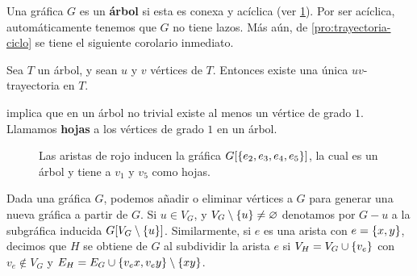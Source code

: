 Una gr\'afica $G$ es un \textbf{\'arbol} si esta es conexa
y ac\'iclica (ver \cref{fig:grafica-dibujo3}). Por ser ac\'iclica, autom\'aticamente tenemos que $G$ no tiene
lazos. M\'as a\'un, de \cref{pro:trayectoria-ciclo} se tiene el siguiente
corolario inmediato.

\begin{corolario}
\label{cor:unitray}
  Sea $T$ un \'arbol, y sean $u$ y $v$ v\'ertices de $T$. Entonces existe una
  \'unica $uv$-trayectoria en $T$.
\end{corolario}

 implica que en un \'arbol no trivial existe al menos un
v\'ertice de grado $1$. Llamamos \textbf{hojas} a los v\'ertices de
grado $1$ en un \'arbol.

\begin{figure}[H]
  \centering
  \captionsetup{font=footnotesize}
  \caption{Las aristas de rojo inducen la gr\'afica $G[\left\{ e_2,e_3,e_4,e_5\right\}]$, la
  cual es un \'arbol y tiene a $v_1$ y $v_5$ como hojas.}
  \label{fig:grafica-dibujo3}
  \end{figure}

Dada una gr\'afica $G$, podemos a\~nadir o eliminar v\'ertices a $G$ para
generar una nueva gr\'afica a partir de $G$. Si $u\in V_G$, y
$V_G\setminus\left\{ u\right\}\neq \varnothing$ denotamos por $G-u$ a la subgr\'afica
inducida $G[V_G\setminus \left\{ u\right\}]$. Similarmente, si $e$ es una arista con
$e=\left\{ x,y\right\}$, decimos que $H$ se obtiene de $G$ al subdividir la arista $e$ si
$V_H=V_G\cup\left\{ v_e\right\}$ con $v_e\notin V_G$ y $E_H=E_G\cup \left\{ v_ex, v_ey\right\} \setminus
\left\{ xy\right\}$.

